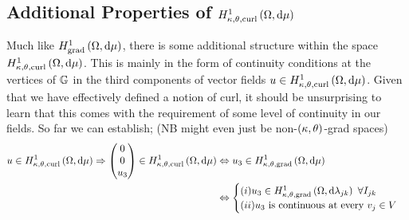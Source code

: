 \subsection{Additional Properties of $H^1_{\kappa,\theta,\mathrm{curl}}\left( \Omega, \mathrm{d}\mu \right)$} \label{sec:ktcurlSobExtraProperties}
Much like $H^1_\mathrm{grad}\left( \Omega, \mathrm{d}\mu \right)$, there is some additional structure within the space $H^1_{\kappa,\theta,\mathrm{curl}}\left( \Omega, \mathrm{d}\mu \right)$.
This is mainly in the form of continuity conditions at the vertices of $\mathbb{G}$ in the third components of vector fields $u\in H^1_{\kappa,\theta,\mathrm{curl}}\left( \Omega, \mathrm{d}\mu \right)$.
Given that we have effectively defined a notion of curl, it should be unsurprising to learn that this comes with the requirement of some level of continuity in our fields.
So far we can establish; (NB might even just be non-$\left( \kappa, \theta \right)$-grad spaces)
\begin{align*}
	u\in H^1_{\kappa,\theta,\mathrm{curl}}\left( \Omega, \mathrm{d}\mu \right) \Rightarrow
	\begin{pmatrix} 0 \\ 0 \\ u_3 \end{pmatrix}\in H^1_{\kappa,\theta,\mathrm{curl}}\left( \Omega, \mathrm{d}\mu \right) &\Leftrightarrow 
	u_3\in H^1_{\kappa,\theta,\mathrm{grad}}\left( \Omega, \mathrm{d}\mu \right) \\
	&\Leftrightarrow	\begin{cases} (i) u_3\in H^1_{\kappa,\theta,\mathrm{grad}}\left( \Omega, \mathrm{d}\lambda_{jk} \right) \ \forall I_{jk} \\ (ii) u_3 \text{ is continuous at every } v_j\in V	\end{cases}
\end{align*}

